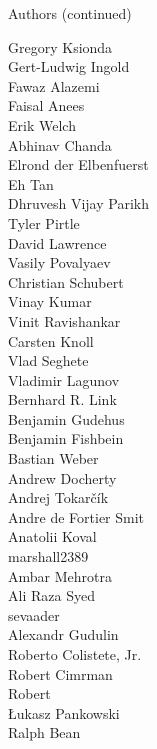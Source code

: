 \documentclass[xcolor=svgnames]{beamer}
\begin{document}
  \begin{frame}{Authors (continued)}
    \begin{multicols}{5}
      \tiny

          Gregory Ksionda\\
          Gert-Ludwig Ingold\\
          Fawaz Alazemi\\
          Faisal Anees\\
          Erik Welch\\
          Abhinav Chanda\\
          Elrond der Elbenfuerst\\
          Eh Tan\\
          Dhruvesh Vijay Parikh\\
          Tyler Pirtle\\
          David Lawrence\\
          Vasily Povalyaev\\
          Christian Schubert\\
          Vinay Kumar\\
          Vinit Ravishankar\\
          Carsten Knoll\\
          Vlad Seghete\\
          Vladimir Lagunov\\
          Bernhard R. Link\\
          Benjamin Gudehus\\
          Benjamin Fishbein\\
          Bastian Weber\\
          Andrew Docherty\\
          Andrej Tokarčík\\
          Andre de Fortier Smit\\
          Anatolii Koval\\
          marshall2389\\
          Ambar Mehrotra\\
          Ali Raza Syed\\
          sevaader\\
          Alexandr Gudulin\\
          Roberto Colistete, Jr.\\
          Robert Cimrman\\
          Robert\\
          Łukasz Pankowski\\
          Ralph Bean\\
    \end{multicols}
  \end{frame}
\end{document}
